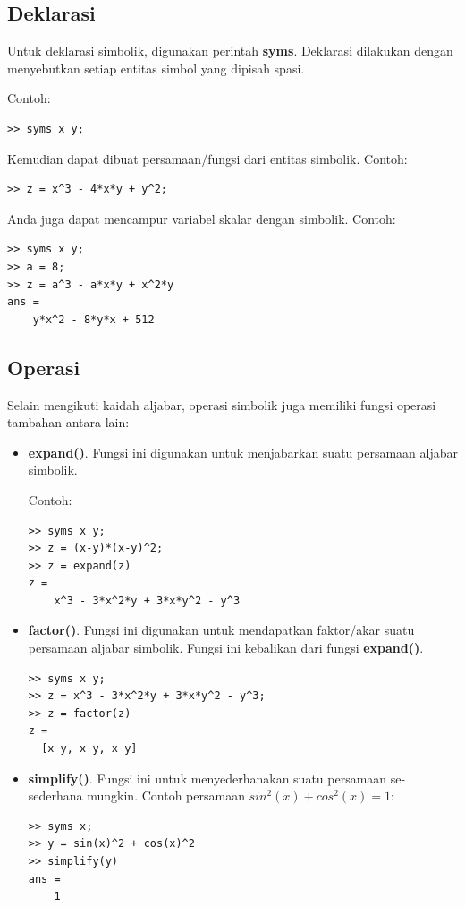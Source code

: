 \documentclass[12pt]{book}
\begin{document}
	\subsection{Deklarasi}

	Untuk deklarasi simbolik, digunakan perintah \textbf{syms}.
	Deklarasi dilakukan dengan menyebutkan setiap entitas simbol yang dipisah spasi.

	Contoh:
	\begin{verbatim}
>> syms x y;
	\end{verbatim}

	Kemudian dapat dibuat persamaan/fungsi dari entitas simbolik.
	Contoh:
 	\begin{verbatim}
>> z = x^3 - 4*x*y + y^2;
 	\end{verbatim}

 	Anda juga dapat mencampur variabel skalar dengan simbolik.
 	Contoh:
 	\begin{verbatim}
>> syms x y;
>> a = 8;
>> z = a^3 - a*x*y + x^2*y
ans =
    y*x^2 - 8*y*x + 512
 	\end{verbatim}

	\subsection{Operasi}

	Selain mengikuti kaidah aljabar, operasi simbolik juga memiliki fungsi operasi tambahan antara lain:
	\begin{itemize}
		\item \textbf{expand()}. Fungsi ini digunakan untuk menjabarkan suatu persamaan aljabar simbolik.

		Contoh:
		\begin{verbatim}
>> syms x y;
>> z = (x-y)*(x-y)^2;
>> z = expand(z)
z =
    x^3 - 3*x^2*y + 3*x*y^2 - y^3
		\end{verbatim}

		\item \textbf{factor()}. Fungsi ini digunakan untuk mendapatkan faktor/akar suatu persamaan aljabar simbolik.
		Fungsi ini kebalikan dari fungsi \textbf{expand()}.
		\begin{verbatim}
>> syms x y;
>> z = x^3 - 3*x^2*y + 3*x*y^2 - y^3;
>> z = factor(z)
z =
  [x-y, x-y, x-y]
		\end{verbatim}

		\item \textbf{simplify()}. Fungsi ini untuk menyederhanakan suatu persamaan se-sederhana mungkin.
		Contoh persamaan $sin^{2}(x) + cos^{2}(x) = 1$:
		\begin{verbatim}
>> syms x;
>> y = sin(x)^2 + cos(x)^2
>> simplify(y)
ans =
    1
		\end{verbatim}
	\end{itemize}
\end{document}
